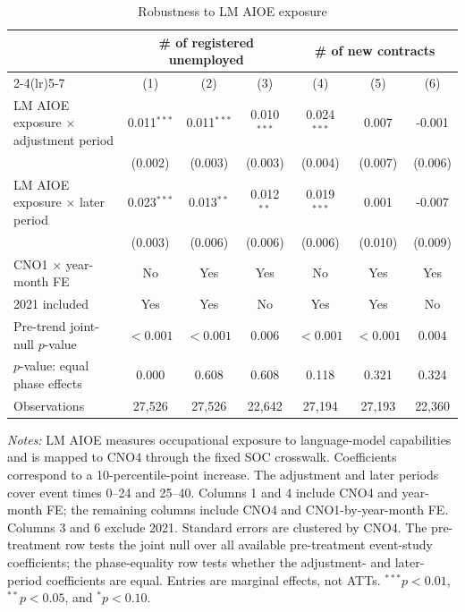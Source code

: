 \begin{table}[!htbp]
\centering
\caption{Robustness to LM AIOE exposure}
\label{tab:v1_lm_aioe_exposure}
\begin{threeparttable}
\scriptsize
\setlength{\tabcolsep}{3.5pt}
\begin{tabular}{lcccccc}
\toprule
& \multicolumn{3}{c}{\# of registered unemployed} & \multicolumn{3}{c}{\# of new contracts} \\
\cmidrule(lr){2-4}\cmidrule(lr){5-7}
& (1) & (2) & (3) & (4) & (5) & (6) \\
\midrule
LM AIOE exposure $\times$ adjustment period & 0.011$^{***}$ & 0.011$^{***}$ & 0.010$^{***}$ & 0.024$^{***}$ & 0.007 & -0.001 \\
 & (0.002) & (0.003) & (0.003) & (0.004) & (0.007) & (0.006) \\
LM AIOE exposure $\times$ later period & 0.023$^{***}$ & 0.013$^{**}$ & 0.012$^{**}$ & 0.019$^{***}$ & 0.001 & -0.007 \\
 & (0.003) & (0.006) & (0.006) & (0.006) & (0.010) & (0.009) \\
\midrule
CNO1 $\times$ year-month FE & No & Yes & Yes & No & Yes & Yes \\
2021 included & Yes & Yes & No & Yes & Yes & No \\
Pre-trend joint-null $p$-value & $<0.001$ & $<0.001$ & 0.006 & $<0.001$ & $<0.001$ & 0.004 \\
$p$-value: equal phase effects & 0.000 & 0.608 & 0.608 & 0.118 & 0.321 & 0.324 \\
Observations & 27,526 & 27,526 & 22,642 & 27,194 & 27,193 & 22,360 \\
\bottomrule
\end{tabular}
\begin{tablenotes}[flushleft]
\footnotesize
\item \emph{Notes:} LM AIOE measures occupational exposure to language-model capabilities and is mapped to CNO4 through the fixed SOC crosswalk. Coefficients correspond to a 10-percentile-point increase. The adjustment and later periods cover event times 0--24 and 25--40. Columns 1 and 4 include CNO4 and year-month FE; the remaining columns include CNO4 and CNO1-by-year-month FE. Columns 3 and 6 exclude 2021. Standard errors are clustered by CNO4. The pre-treatment row tests the joint null over all available pre-treatment event-study coefficients; the phase-equality row tests whether the adjustment- and later-period coefficients are equal. Entries are marginal effects, not ATTs. $^{***}p<0.01$, $^{**}p<0.05$, and $^{*}p<0.10$.
\end{tablenotes}
\end{threeparttable}
\end{table}
